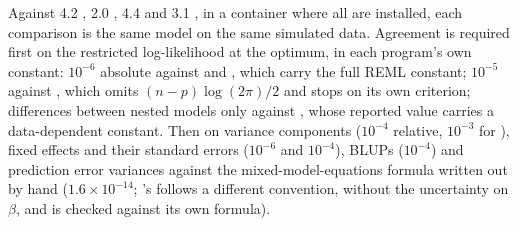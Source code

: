 Against  4.2 \citep{asreml},  2.0 \citep{lme4},
 4.4 \citep{sommer} and  3.1 \citep{nlme}, in a
container where all are installed, each comparison is the same model on the
same simulated data. Agreement is required first on the restricted
log-likelihood at the optimum, in each program's own constant: $10^{-6}$
absolute against  and , which carry the full REML
constant; $10^{-5}$ against , which omits $(n-p)\log(2\pi)/2$ and
stops on its own criterion; differences between nested models only against
, whose reported value carries a data-dependent constant. Then on
variance components ($10^{-4}$ relative, $10^{-3}$ for ), fixed
effects and their standard errors ($10^{-6}$ and $10^{-4}$), BLUPs
($10^{-4}$) and prediction error variances against the mixed-model-equations
formula written out by hand ($1.6 \times 10^{-14}$; 's
 follows a different convention, without the uncertainty on
$\beta$, and is checked against its own formula).

